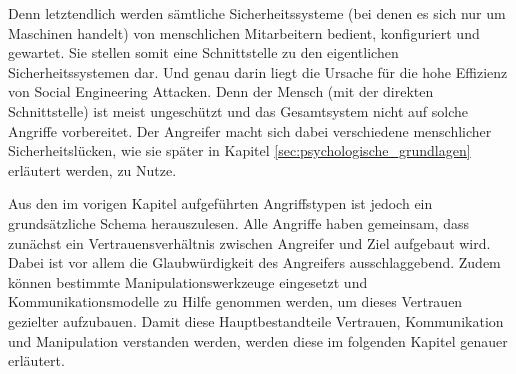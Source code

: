 Denn letztendlich werden sämtliche Sicherheitssysteme (bei denen es sich nur um Maschinen handelt) von menschlichen Mitarbeitern bedient, konfiguriert und gewartet.
Sie stellen somit eine Schnittstelle zu den eigentlichen Sicherheitssystemen dar.
Und genau darin liegt die Ursache für die hohe Effizienz von Social Engineering Attacken.
Denn der Mensch (mit der direkten Schnittstelle) ist meist ungeschützt und das Gesamtsystem nicht auf solche Angriffe vorbereitet.
Der Angreifer macht sich dabei verschiedene menschlicher Sicherheitslücken, wie sie später in Kapitel \vref{sec:psychologische_grundlagen} erläutert werden, zu Nutze.

Aus den im vorigen Kapitel aufgeführten Angriffstypen ist jedoch ein grundsätzliche Schema herauszulesen.
Alle Angriffe haben gemeinsam, dass zunächst ein Vertrauensverhältnis zwischen Angreifer und Ziel aufgebaut wird.
Dabei ist vor allem die Glaubwürdigkeit des Angreifers ausschlaggebend.
Zudem können bestimmte Manipulationswerkzeuge eingesetzt und Kommunikationsmodelle zu Hilfe genommen werden, um dieses Vertrauen gezielter aufzubauen.
Damit diese Hauptbestandteile Vertrauen, Kommunikation und Manipulation verstanden werden, werden diese im folgenden Kapitel genauer erläutert.

